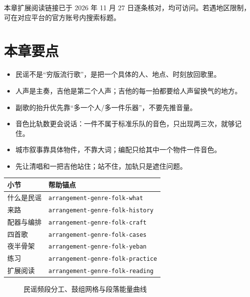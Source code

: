 本章扩展阅读链接已于 2026 年 11 月 27 日逐条核对，均可访问。若遇地区限制，可在对应平台的官方账号内搜索标题。

\section{本章要点}
\label{sec:folk-takeaways}

\begin{itemize}
\item 民谣不是“穷版流行歌”，是把一个具体的人、地点、时刻放回歌里。
\item 人声是主奏，吉他是第二个人声；吉他的每一拍都要给人声留换气的地方。
\item 副歌的抬升优先靠“多一个人/多一件乐器”，不要先推音量。
\item 音色比轨数更会说话：一件不属于标准乐队的音色，只出现两三次，就够记住。
\item 城市叙事靠具体物件，不靠大词；编配只给其中一个物件一件音色。
\item 先让清唱和一把吉他站住；站不住，加轨只是遮住问题。
\end{itemize}

\begin{helpmapping}
\begin{longtable}{p{}p{}}
\toprule
小节 & 帮助锚点 \\
\midrule
什么是民谣 & \texttt{arrangement-genre-folk-what} \\
来路 & \texttt{arrangement-genre-folk-history} \\
配器与编排 & \texttt{arrangement-genre-folk-craft} \\
四首歌 & \texttt{arrangement-genre-folk-cases} \\
夜半骨架 & \texttt{arrangement-genre-folk-yeban} \\
练习 & \texttt{arrangement-genre-folk-practice} \\
扩展阅读 & \texttt{arrangement-genre-folk-reading} \\
\bottomrule
\end{longtable}
\end{helpmapping}

\begin{figure}[htbp]\centering
{}
\caption{民谣频段分工、鼓组网格与段落能量曲线}
\end{figure}
